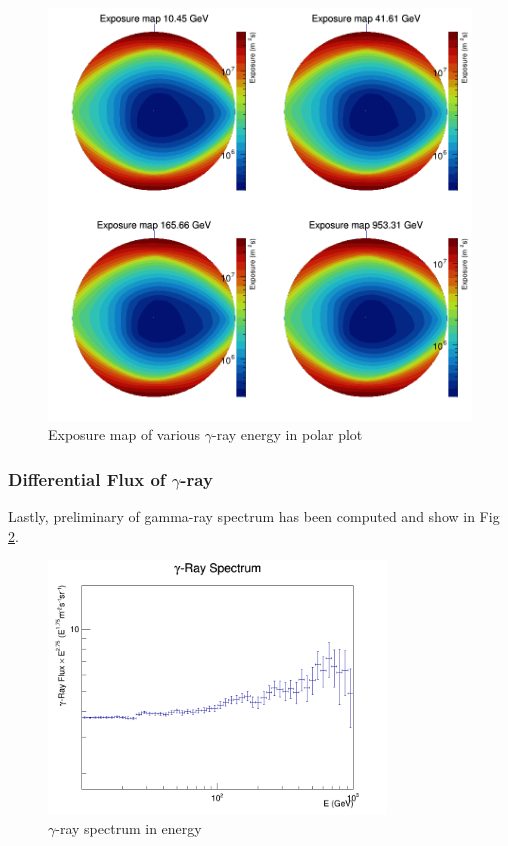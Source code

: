 \begin{figure}[h!]
    \centering
    \includegraphics[width=\textwidth]{img/polar_expmaps}
    \caption{Exposure map of various $\gamma$-ray energy in polar plot}
    \label{fig:expmapspolar}
\end{figure}

\subsubsection*{Differential Flux of $\gamma$-ray}

Lastly, preliminary of gamma-ray spectrum has been computed and show in Fig \ref{fig:gammarayfluxnew}.

\begin{figure}[h!]
    \centering
    \includegraphics[width=0.8\textwidth]{img/flx_hist_2}
    \caption{$\gamma$-ray spectrum in energy}
    \label{fig:gammarayfluxnew}
\end{figure}

